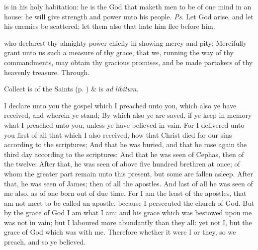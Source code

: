 



\properantiphonfix

\introit
{} is in his holy habitation: he is the God that maketh men to be of one mind in an house: he will give strength and power unto his people. \textit{Ps.} Let God arise, and let his enemies be scattered: let them also that hate him flee before him.

\collect
{} who declarest thy almighty power chiefly in showing mercy and pity; Mercifully grant unto us such a measure of thy grace, that we, running the way of thy commandments, may obtain thy gracious promises, and be made partakers of thy heavenly treasure. Through.
\begin{rubric}
     Collect is of the Saints (p. \pageref{SPSaints}) \&  is \emph{ad libitum}.
\end{rubric}

 I declare unto you the gospel which I preached unto you, which also ye have received, and wherein ye stand; By which also ye are saved, if ye keep in memory what I preached unto you, unless ye have believed in vain. For I delivered unto you first of all that which I also received, how that Christ died for our sins according to the scriptures; And that he was buried, and that he rose again the third day according to the scriptures: And that he was seen of Cephas, then of the twelve: After that, he was seen of above five hundred brethren at once; of whom the greater part remain unto this present, but some are fallen asleep. After that, he was seen of James; then of all the apostles. And last of all he was seen of me also, as of one born out of due time. For I am the least of the apostles, that am not meet to be called an apostle, because I persecuted the church of God. But by the grace of God I am what I am: and his grace which was bestowed upon me was not in vain; but I laboured more abundantly than they all: yet not I, but the grace of God which was with me. Therefore whether it were I or they, so we preach, and so ye believed.

